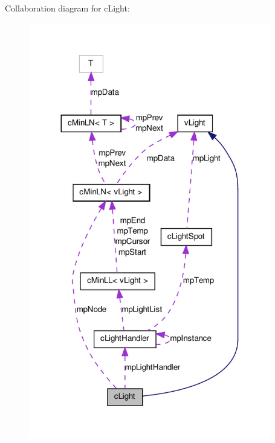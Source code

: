 Collaboration diagram for cLight:
\nopagebreak
\begin{figure}[H]
\begin{center}
\leavevmode
\includegraphics[width=299pt]{classc_light__coll__graph}
\end{center}
\end{figure}

